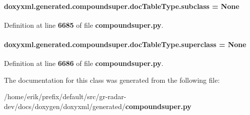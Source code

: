\paragraph[{subclass}]{\setlength{\rightskip}{0pt plus 5cm}doxyxml.\+generated.\+compoundsuper.\+doc\+Table\+Type.\+subclass = None\hspace{0.3cm}{\ttfamily [static]}}\label{classdoxyxml_1_1generated_1_1compoundsuper_1_1docTableType_ade1d2aa7ab83b7d0639d3a048ee8fb26}


Definition at line {\bf 6685} of file {\bf compoundsuper.\+py}.

\paragraph[{superclass}]{\setlength{\rightskip}{0pt plus 5cm}doxyxml.\+generated.\+compoundsuper.\+doc\+Table\+Type.\+superclass = None\hspace{0.3cm}{\ttfamily [static]}}\label{classdoxyxml_1_1generated_1_1compoundsuper_1_1docTableType_aae36f6b4e7e6adaa319ab0063f8f32ba}


Definition at line {\bf 6686} of file {\bf compoundsuper.\+py}.



The documentation for this class was generated from the following file\+:\begin{DoxyCompactItemize}
\item 
/home/erik/prefix/default/src/gr-\/radar-\/dev/docs/doxygen/doxyxml/generated/{\bf compoundsuper.\+py}\end{DoxyCompactItemize}
